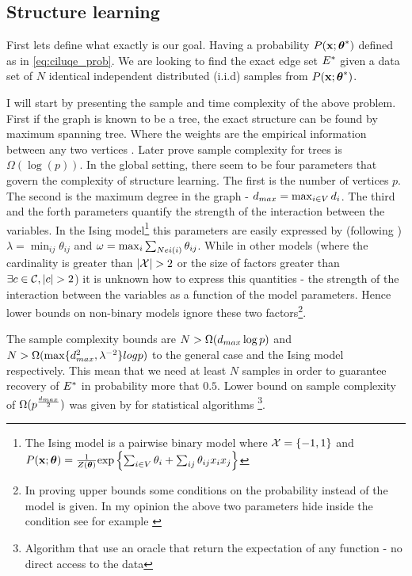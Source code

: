 \subsection{Structure learning}
First lets define what exactly is our goal.
Having a probability $P({\bf x};{\boldsymbol{\theta}}^{*})$ defined as in \eqref{eq:ciluqe_prob}.
We are looking to find the exact edge set ${E}^{*}$ given a data set of $N$ identical independent distributed (i.i.d) samples from $P({\bf x};{\boldsymbol{\theta}}^{*})$.

I will start by presenting the sample and time complexity of the above problem. 
First if the graph is known to be a tree, the exact structure can be found by maximum spanning tree.  Where the  weights are the empirical information between any two vertices \cite{chowLiu}. 
Later \cite{tan2011learning} prove sample complexity for trees is $\Omega(\log(p))$.
In the global setting, there seem to be four parameters that govern the complexity of structure learning.
The first is  the number of vertices $p$.
The second is the maximum degree in the graph - $d_{max} = \max_{i \in V} d_i$.
The third and the forth parameters quantify the strength of the interaction between the variables.
In the Ising model\footnote{ The Ising model is a pairwise binary model where ${\cal X} = \{-1,1\}$ and $P({\bf x};\boldsymbol{\theta}) = \frac{1}{Z(\boldsymbol{\theta})} {\mathrm{exp}}\left\{\sum_{i \in V}\theta_i + \sum_{ij}\theta_{ij}x_ix_j\right\}$} this parameters are easily expressed by (following \cite{santhanam2012information}) $\lambda = \min_{ij} \theta_{ij}$ and $\omega = \max_i \sum_{Nei(i)} \theta_{ij}$.
While in other models (where the cardinality is greater than $|\cX|>2$ or the size of factors greater than $\exists c \in \cC, |c|>2$) it is unknown how to express this quantities - the strength of the interaction between the variables as a function of the model parameters.
Hence lower bounds  on non-binary models ignore these two factors\footnote{In proving upper bounds some conditions on the probability instead of the model is given. In my opinion the above two parameters hide inside the condition see for example \cite{bresler2008reconstruction}}.

The sample complexity bounds are $N > \Omega(d_{max} \log p)$ and $N > \Omega(\max\{d_{max}^2, \lambda^{-2}\}log p) $ to the general case and the Ising model respectively. This mean that we need at least $N$ samples in order to guarantee recovery of ${E}^{*}$ in probability more that $0.5$.
Lower bound on sample complexity of $\Omega(p^{\frac{d_{max}}{2}})$ was given by \cite{bresler2014structure} for statistical algorithms \cite{feldman2013statistical}\footnote{Algorithm that use an oracle that return the expectation of any function - no direct access to the data}.

